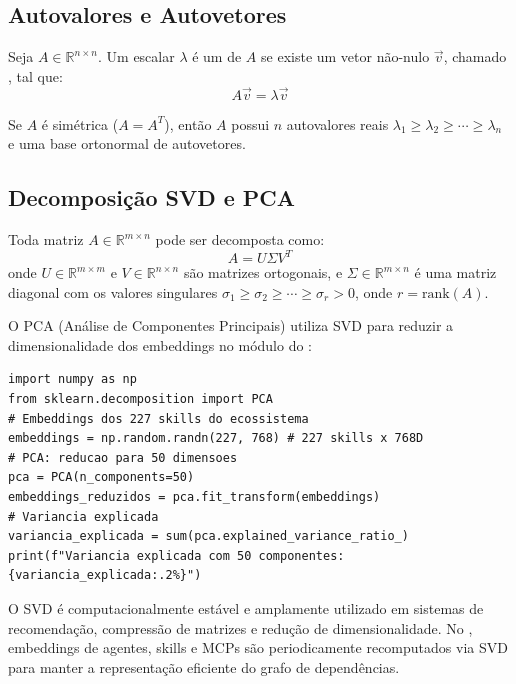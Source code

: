 \subsection{Autovalores e Autovetores}
\begin{definicao}
Seja $A \in \mathbb{R}^{n \times n}$. Um escalar $\lambda$ é um
 de $A$ se existe um vetor não-nulo $\vec{v}$,
chamado , tal que:
\[A\vec{v} = \lambda \vec{v}
\]
\end{definicao}
\begin{teorema}
Se $A$ é simétrica ($A = A^T$), então $A$ possui $n$ autovalores reais
$\lambda_1 \geq \lambda_2 \geq \cdots \geq \lambda_n$ e uma base
ortonormal de autovetores.
\end{teorema}
\subsection{Decomposição SVD e PCA}
\begin{definicao}
Toda matriz $A \in \mathbb{R}^{m \times n}$ pode ser decomposta como:
\[A = U \Sigma V^T
\]
onde $U \in \mathbb{R}^{m \times m}$ e $V \in \mathbb{R}^{n \times n}$
são matrizes ortogonais, e $\Sigma \in \mathbb{R}^{m \times n}$ é uma
matriz diagonal com os valores singulares $\sigma_1 \geq \sigma_2 \geq
\cdots \geq \sigma_r > 0$, onde $r = \text{rank}(A)$.
\end{definicao}
\begin{exemplo}
O PCA (Análise de Componentes Principais) utiliza SVD para reduzir a
dimensionalidade dos embeddings no módulo  do
\opencodeeco{}:
\begin{lstlisting}[style=pythonstyle]
import numpy as np
from sklearn.decomposition import PCA
# Embeddings dos 227 skills do ecossistema
embeddings = np.random.randn(227, 768) # 227 skills x 768D
# PCA: reducao para 50 dimensoes
pca = PCA(n_components=50)
embeddings_reduzidos = pca.fit_transform(embeddings)
# Variancia explicada
variancia_explicada = sum(pca.explained_variance_ratio_)
print(f"Variancia explicada com 50 componentes: {variancia_explicada:.2%}")
\end{lstlisting}
\end{exemplo}
\begin{observacao}
O SVD é computacionalmente estável e amplamente utilizado em sistemas de
recomendação, compressão de matrizes e redução de dimensionalidade. No
\opencodeeco{}, embeddings de agentes, skills e MCPs são periodicamente
recomputados via SVD para manter a representação eficiente do grafo de
dependências.
\end{observacao}
